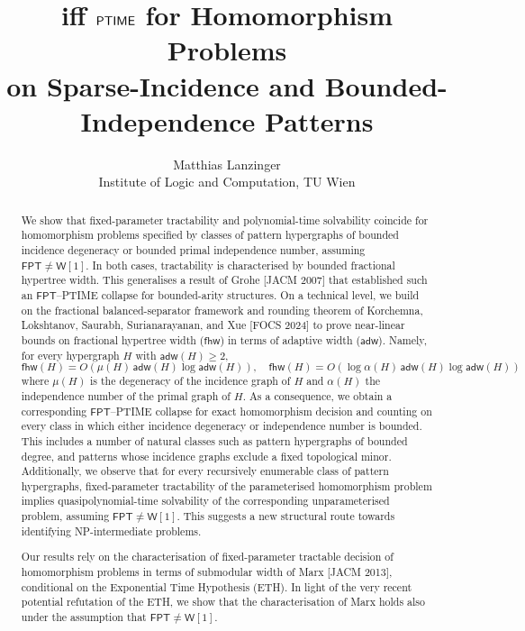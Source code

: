 \documentclass[11pt,letterpaper]{article}
\title{\FPT{} iff $\mathsf{PTIME}$ for Homomorphism Problems\\
on Sparse-Incidence and Bounded-Independence Patterns}
\author{Matthias Lanzinger\\
Institute of Logic and Computation, TU Wien}
\date{}
\theoremstyle{definition}
\theoremstyle{remark}
\newcommand{\fhw}{\mathsf{fhw}}
\newcommand{\adw}{\mathsf{adw}}
\newcommand{\FPT}{\ensuremath{\mathsf{FPT}}}
\newcommand{\wone}{\ensuremath{\mathsf{W}[1]}}
\providecommand{\adw}{\operatorname{adw}}
\providecommand{\fhw}{\operatorname{fhw}}
\providecommand{\FPT}{\ensuremath{\mathsf{FPT}}}
\begin{document}
%
\maketitle

\begin{abstract}
\normalsize
We show that fixed-parameter tractability and polynomial-time solvability coincide for homomorphism problems specified by classes of pattern hypergraphs of bounded incidence degeneracy or bounded primal independence number, assuming $\FPT \ne \wone$. In both cases, tractability is characterised by bounded fractional hypertree width. This generalises a result of Grohe [JACM 2007] that established such an \FPT{}--PTIME collapse for bounded-arity structures.
%
On a technical level, we build on the fractional balanced-separator framework and rounding theorem of Korchemna, Lokshtanov, Saurabh, Surianarayanan, and Xue [FOCS 2024] to prove near-linear bounds on fractional hypertree width ($\fhw$) in terms of adaptive width ($\adw$). Namely, for every
hypergraph $H$ with $\adw(H)\ge2$,
\[
\fhw(H)=O\!\left(\mu(H)\,\adw(H)\log\adw(H)\right), \quad
\fhw(H)=O\!\left(\log\alpha(H)\,\adw(H)\log\adw(H)\right)
\]
where $\mu(H)$ is the degeneracy of the incidence graph of $H$ and $\alpha(H)$ the independence number of the primal graph of $H$.
%
As a consequence, we obtain a corresponding \FPT{}--PTIME collapse for exact homomorphism decision and counting on every class in which either incidence degeneracy or independence number is bounded. This includes a number of natural classes such as pattern hypergraphs of bounded degree, and patterns whose incidence graphs exclude a fixed topological minor.
%
Additionally, we observe that for every recursively enumerable class of pattern hypergraphs, fixed-parameter tractability of the parameterised homomorphism problem implies quasipolynomial-time solvability of the corresponding unparameterised problem, assuming $\FPT \ne \wone$. This suggests a new structural route towards identifying NP-intermediate problems.

Our results rely on the characterisation of fixed-parameter tractable decision of homomorphism problems in terms of submodular width of Marx [JACM 2013], conditional on the Exponential Time Hypothesis (ETH).
In light of the very recent potential refutation of the ETH, we show that the characterisation of Marx holds also under the assumption that $\FPT \ne \wone$.
\end{abstract}
 \clearpage

\tableofcontents
\clearpage
\end{document}
